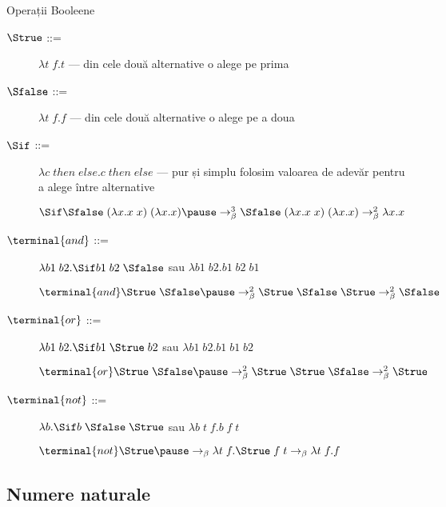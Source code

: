 \documentclass[xcolor=pdftex,romanian,colorlinks]{beamer}
\newcommand{\SSnot}{\terminal{not}}
\newcommand{\Sand}{\terminal{and}}
\newcommand{\Sor}{\terminal{or}}
\begin{document}
\begin{frame}{Operații Booleene}
  \begin{description}
  \item[$\Strue$ ::=] $\lambda t\; f. t$
      --- din cele două alternative o alege pe prima
  \item[$\Sfalse$ ::=] $\lambda t\; f. f$
      --- din cele două alternative o alege pe a doua
  \item[$\Sif$ ::= ] $\lambda c\; then\; else. c\; then\; else$
  --- pur și simplu folosim valoarea de adevăr pentru a alege între alternative

  $\Sif \Sfalse\; (\lambda x.x\; x)\; (\lambda x.x) \pause \rightarrow^3_\beta
   \Sfalse\; (\lambda x.x\; x)\; (\lambda x.x) \rightarrow^2_\beta \lambda x.x$

  \item[$\Sand$ ::= ] $\lambda b1\; b2.\Sif b1\; b2\; \Sfalse$ sau  $\lambda b1\; b2.b1\; b2\; b1$

  $\Sand \Strue\; \Sfalse \pause \rightarrow^2_\beta \Strue\; \Sfalse\; \Strue \rightarrow^2_\beta \Sfalse$
  \item[$\Sor$ ::= ] $\lambda b1\; b2.\Sif b1\; \Strue\; b2$ sau  $\lambda b1\; b2.b1\; b1\; b2$

  $\Sor \Strue\; \Sfalse \pause \rightarrow^2_\beta \Strue\; \Strue\; \Sfalse \rightarrow^2_\beta \Strue$
  \item[$\SSnot$ ::= ] $\lambda b.\Sif b\; \Sfalse\; \Strue$ sau $\lambda b\; t\; f.b\; f\; t$
  
  $\SSnot \Strue \pause \rightarrow_\beta \lambda t\; f.\Strue\; f\; t \rightarrow_\beta \lambda t\; f.f$
  \end{description}
\end{frame}

\subsection{Numere naturale}
\end{document}
